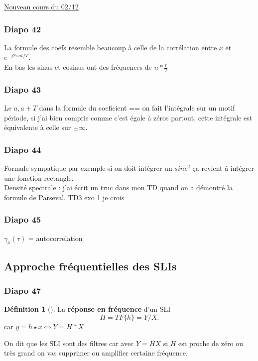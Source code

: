 \documentclass{article}
\theoremstyle{plain}%
\theoremstyle{definition}
\newtheorem{defn}{Définition}[section]
\theoremstyle{remark}
\begin{document}
\underline{Nouveau cours du 02/12} \\

\subsubsection{Diapo 42}
La formule des coefs resemble beaucoup à celle de la corrélation entre $ x $ et $ e^{-j2 \pi nt/T} $. \\
En bas les sinus et cosinus ont des fréquences de $ n*\frac{t}{T} $ 

\subsubsection{Diapo 43}
Le $ a, a+T $ dans la formule du coeficient == on fait l'intégrale sur un motif période, si j'ai bien compris comme c'est égale à zéros partout, cette intégrale est équivalente à celle sur $ \pm \infty  $.

\subsubsection{Diapo 44}
Formule sympatique par exemple si on doit intégrer un $ sinc^2 $ ça revient à intégrer une fonction rectangle. \\
Densité spectrale : j'ai écrit un truc dans mon TD quand on a démontré la formule de Parseval. TD3 exo 1 je crois

\subsubsection{Diapo 45}
$ \gamma _x (\tau ) $ = autocorrelation 

\subsection{Approche fréquentielles des SLIs}
\subsubsection{Diapo 47}

\begin{defn}[]
    La \textbf{réponse en fréquence} d'un SLI 
    \[
        H = TF\{h\}= Y/X
    .\]
    car $ y = h \star x \Leftrightarrow Y = H*X$ 
\end{defn}
On dit que les SLI sont des filtres car avec $ Y=HX $ si $ H $ est proche de zéro ou très grand on vas supprimer ou amplifier certaine fréquence.
\end{document}
